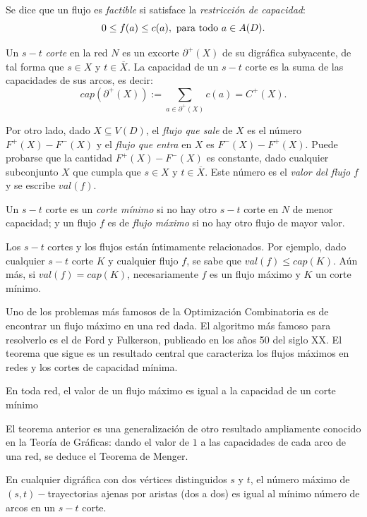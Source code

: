 Se dice que un flujo es \textit{factible} si satisface la \textit{restricción de capacidad}: $$0 \leq f(a) \leq c(a), \textnormal{ para todo } a \in A(D).$$

Un $s-t$ \textit{corte} en la red $N$ es un excorte $\partial^{+}(X)$ de su digráfica subyacente, de tal forma que $s \in X$ y $t\in \overline{X}$. La capacidad de un $s-t$ corte es la suma de las capacidades de sus arcos, es decir:$$cap(\partial^{+}(X)):=\sum_{a \in \partial^{+}(X)}c(a) = C^{+}(X).$$

Por otro lado, dado $X\subseteq V(D)$, el \textit{flujo que sale} de $X$ es el número $F^{+}(X)- F^{-}(X)$ y el \textit{flujo que entra} en $X$ es $F^{-}(X)- F^{+}(X)$. Puede probarse que la cantidad  $F^{+}(X)- F^{-}(X)$ es constante, dado cualquier subconjunto $X$ que cumpla que $s \in X$ y $t\in \overline{X}$. Este número es el \textit{valor del flujo $f$} y se escribe $val(f)$.

Un $s -t$ corte es un \textit{corte mínimo} si no hay otro $s-t$ corte en $N$ de menor capacidad; y un flujo $f$ es de \textit{flujo máximo} si no hay otro flujo de mayor valor. 

Los $s -t$ cortes y los flujos están íntimamente relacionados. Por ejemplo, dado cualquier $s-t$ corte $K$ y cualquier flujo $f$, se sabe que $val(f) \leq cap(K)$. Aún más, si $val(f) = cap(K)$, necesariamente $f$ es un flujo máximo y $K$ un corte  mínimo.

Uno de los problemas más famosos de la Optimización Combinatoria es de encontrar un flujo máximo en una red dada. El algoritmo más famoso para resolverlo es el de Ford y Fulkerson, publicado en los años 50 del siglo XX. El teorema que sigue es un resultado central que caracteriza los flujos máximos en redes y los cortes de capacidad mínima.

\begin{teo}
En toda red, el valor de un flujo máximo es igual a la capacidad de un corte mínimo
\end{teo}

El teorema anterior es una generalización de otro resultado ampliamente conocido en la Teoría de Gráficas: dando el valor de $1$ a las capacidades de cada arco de una red, se deduce el Teorema de Menger.

\begin{teo}
En cualquier digráfica con dos vértices distinguidos $s$ y $t$, el número máximo de $(s,t)-$trayectorias ajenas por aristas (dos a dos) es igual al mínimo número de arcos en un $s-t$ corte.
\end{teo}

